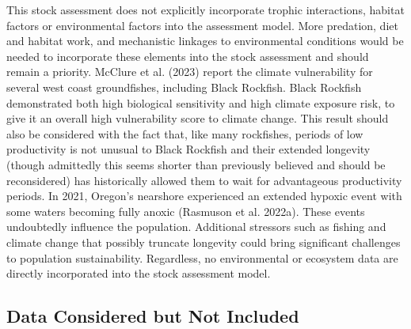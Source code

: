 \documentclass[11pt,
  letterpaper,
]{article}
\begin{document}
This stock assessment does not explicitly incorporate trophic interactions, habitat factors or environmental factors into the assessment model. More predation, diet and habitat work, and mechanistic linkages to environmental conditions would be needed to incorporate these elements into the stock assessment and should remain a priority. McClure et al. (2023) report the climate vulnerability for several west coast groundfishes, including Black Rockfish. Black Rockfish demonstrated both high biological sensitivity and high climate exposure risk, to give it an overall high vulnerability score to climate change. This result should also be considered with the fact that, like many rockfishes, periods of low productivity is not unusual to Black Rockfish and their extended longevity (though admittedly this seems shorter than previously believed and should be reconsidered) has historically allowed them to wait for advantageous productivity periods. In 2021, Oregon's nearshore experienced an extended hypoxic event with some waters becoming fully anoxic (Rasmuson et al. 2022a). These events undoubtedly influence the population. Additional stressors such as fishing and climate change that possibly truncate longevity could bring significant challenges to population sustainability. Regardless, no environmental or ecosystem data are directly incorporated into the stock assessment model.

\hypertarget{data-considered-but-not-included}{%
\subsection{Data Considered but Not Included}\label{data-considered-but-not-included}}
\end{document}

